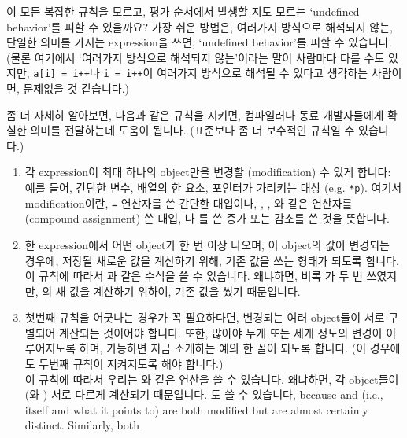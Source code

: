 \begin{faq}
        이 모든 복잡한 규칙을 모르고, 평가 순서에서 발생할 지도 모르는 `undefined behavior'를
        피할 수 있을까요?
\A
        가장 쉬운 방법은, 여러가지 방식으로 해석되지 않는, 단일한 의미를 가지는
        expression을 쓰면, `undefined behavior'를 피할 수 있습니다. (물론
        여기에서 `여러가지 방식으로 해석되지 않는'이라는 말이 사람마다 다를 수도 있지만,
        \verb|a[i] = i++|나 \verb|i = i++|이 여러가지 방식으로 해석될 수 있다고
        생각하는 사람이면, 문제없을 것 같습니다.)

        좀 더 자세히 알아보면, 다음과 같은 규칙을 지키면, 컴파일러나 동료 개발자들에게
        확실한 의미를 전달하는데 도움이 됩니다. (표준보다 좀 더 보수적인 규칙일 수 있습니다.)
\begin{enumerate}
        \item 각 expression이 최대 하나의 object만을 변경할 (modification) 수 있게
                합니다: 예를 들어,
                간단한 변수, 배열의 한 요소, 포인터가 가리키는 대상 (e.g. \verb+*p+).
                여기서 modification이란, \verb+=+ 연산자를 쓴 간단한 대입이나,
                \TT{+=}, \TT{-=}, \TT{*=}와 같은 연산자를 (compound assignment)
                쓴 대입, \TT{++}나 \TT{--}를 쓴 증가 또는 감소를 쓴 것을 뜻합니다.
        \item 한 expression에서 어떤 object가 한 번 이상 나오며, 이 object의 값이
                변경되는 경우에, 저장될 새로운 값을 계산하기 위해, 기존 값을 쓰는 형태가
                되도록 합니다.  이 규칙에 따라서 과 같은 수식을 쓸 수 있습니다.
                왜냐하면, 비록 가 두 번 쓰였지만, 의 새 값을 계산하기 위하여,
                기존  값을 썼기 때문입니다.
        \item 첫번째 규칙을 어긋나는 경우가 꼭 필요하다면, 변경되는 여러 object들이 서로
                구별되어 계산되는 것이어야 합니다. 
                또한, 많아야 두개 또는 세개 정도의 변경이 이루어지도록 하며,
                가능하면 지금 소개하는 예의 한 꼴이 되도록 합니다. (이 경우에도 두번째 규칙이
                지켜지도록 해야 합니다.) \\
                이 규칙에 따라서 우리는 와 같은 연산을 쓸 수 있습니다.
                왜냐하면, 각 object들이 (와 ) 서로 다르게 계산되기 때문입니다.
                도 쓸 수 있습니다, because  and 
                (i.e.,  itself and what it points to) are both modified
                but are almost certainly distinct.  Similarly, both

\end{enumerate}
\end{faq}
